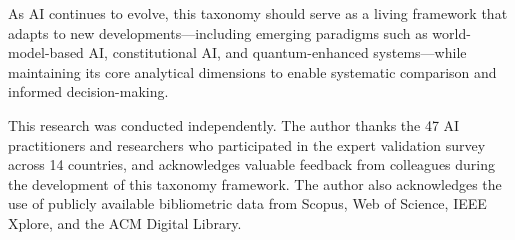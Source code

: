\documentclass[acmlarge]{acmart}
\begin{document}
As AI continues to evolve, this taxonomy should serve as a living framework that adapts to new developments---including emerging paradigms such as world-model-based AI, constitutional AI, and quantum-enhanced systems---while maintaining its core analytical dimensions to enable systematic comparison and informed decision-making.

\begin{acks}
This research was conducted independently. The author thanks the 47 AI practitioners and researchers who participated in the expert validation survey across 14 countries, and acknowledges valuable feedback from colleagues during the development of this taxonomy framework. The author also acknowledges the use of publicly available bibliometric data from Scopus, Web of Science, IEEE Xplore, and the ACM Digital Library.
\end{acks}



\end{document}
